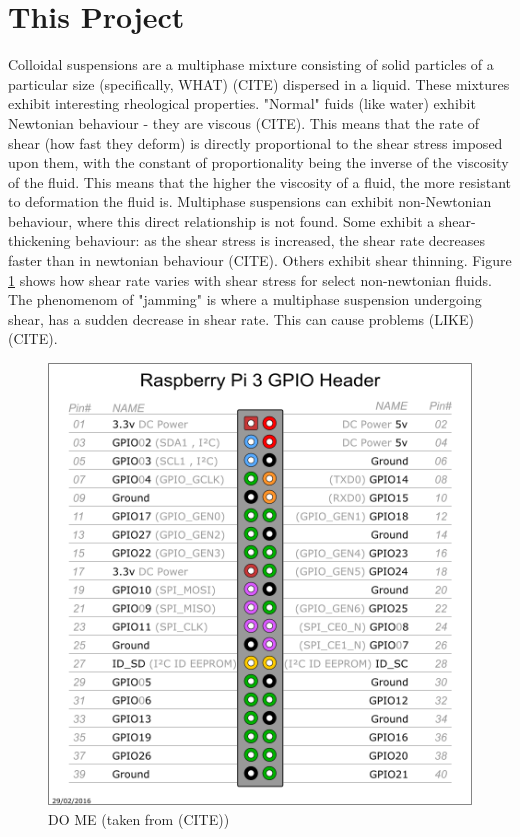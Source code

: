 \documentclass{report}
\begin{document}
	\section{This Project}
	Colloidal suspensions are a multiphase mixture consisting of solid particles of a particular size (specifically, WHAT) (CITE) dispersed in a liquid. These mixtures exhibit interesting rheological properties. "Normal" fuids (like water) exhibit Newtonian behaviour - they are viscous (CITE). This means that the rate of shear (how fast they deform) is directly proportional to the shear stress imposed upon them, with the constant of proportionality being the inverse of the viscosity of the fluid. This means that the higher the viscosity of a fluid, the more resistant to deformation the fluid is. Multiphase suspensions can exhibit non-Newtonian behaviour, where this direct relationship is not found. Some exhibit a shear-thickening behaviour: as the shear stress is increased, the shear rate decreases faster than in newtonian behaviour (CITE). Others exhibit shear thinning. Figure \ref{nonnewtgraphs} shows how shear rate varies with shear stress for select non-newtonian fluids. The phenomenom of "jamming" is where a multiphase suspension undergoing shear, has a sudden decrease in shear rate. This can cause problems (LIKE) (CITE). \newline
	\begin{figure}[!h]
	\centering
	\includegraphics[scale=0.2]{images/gpiopinout.png}
	\caption{DO ME (taken from (CITE))}
	\label{nonnewtgraphs}
	\end{figure} \newline  \noindent
\end{document}
